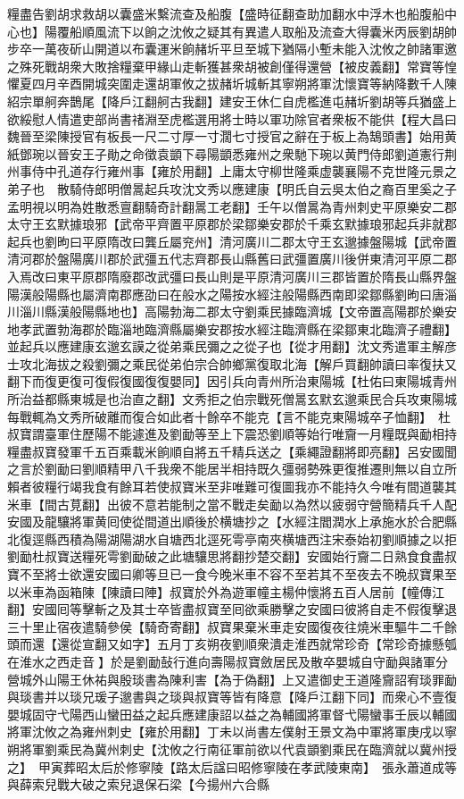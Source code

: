 糧盡告劉胡求救胡以囊盛米繫流查及船腹【盛時征翻查助加翻水中浮木也船腹船中心也】陽覆船順風流下以餉之沈攸之疑其有異遣人取船及流查大得囊米丙辰劉胡帥步卒一萬夜斫山開道以布囊運米餉赭圻平旦至城下猶隔小塹未能入沈攸之帥諸軍邀之殊死戰胡衆大敗捨糧棄甲緣山走斬獲甚衆胡被創僅得還營【被皮義翻】常寶等惶懼夏四月辛酉開城突圍走還胡軍攸之拔赭圻城斬其寧朔將軍沈懷寶等納降數千人陳紹宗單舸奔鵲尾【降戶江翻舸古我翻】建安王休仁自虎檻進屯赭圻劉胡等兵猶盛上欲綏慰人情遣吏部尚書禇淵至虎檻選用將士時以軍功除官者衆板不能供【程大昌曰魏晉至梁陳授官有板長一尺二寸厚一寸濶七寸授官之辭在于板上為鵠頭書】始用黄紙鄧琬以晉安王子勛之命徵袁顗下尋陽顗悉雍州之衆馳下琬以黄門侍郎劉道憲行荆州事侍中孔道存行雍州事【雍於用翻】上庸太守柳世隆乘虚襲襄陽不克世隆元景之弟子也　散騎侍郎明僧暠起兵攻沈文秀以應建康【明氏自云吳太伯之裔百里奚之子孟明視以明為姓散悉亶翻騎奇計翻暠工老翻】壬午以僧暠為青州刺史平原樂安二郡太守王玄默據琅邪【武帝平齊置平原郡於梁鄒樂安郡於千乘玄默據琅邪起兵非就郡起兵也劉昫曰平原隋改曰龔丘屬兖州】清河廣川二郡太守王玄邈據盤陽城【武帝置清河郡於盤陽廣川郡於武彊五代志齊郡長山縣舊曰武彊置廣川後併東清河平原二郡入焉改曰東平原郡隋廢郡改武彊曰長山則是平原清河廣川三郡皆置於隋長山縣界盤陽漢般陽縣也屬濟南郡應劭曰在般水之陽按水經注般陽縣西南即梁鄒縣劉昫曰唐淄川淄川縣漢般陽縣地也】高陽勃海二郡太守劉乘民據臨濟城【文帝置高陽郡於樂安地孝武置勃海郡於臨淄地臨濟縣屬樂安郡按水經注臨濟縣在梁鄒東北臨濟子禮翻】並起兵以應建康玄邈玄謨之從弟乘民彌之之從子也【從才用翻】沈文秀遣軍主解彦士攻北海拔之殺劉彌之乘民從弟伯宗合帥鄉黨復取北海【解戶買翻帥讀曰率復扶又翻下而復更復可復假復國復復嬰同】因引兵向青州所治東陽城【杜佑曰東陽城青州所治益都縣東城是也治直之翻】文秀拒之伯宗戰死僧暠玄默玄邈乘民合兵攻東陽城每戰輒為文秀所破離而復合如此者十餘卒不能克【言不能克東陽城卒子恤翻】　杜叔寶謂臺軍住歷陽不能遽進及劉勔等至上下震恐劉順等始行唯齎一月糧既與勔相持糧盡叔寶發軍千五百乘載米餉順自將五千精兵送之【乘繩證翻將即亮翻】呂安國聞之言於劉勔曰劉順精甲八千我衆不能居半相持既久彊弱勢殊更復推遷則無以自立所賴者彼糧行竭我食有餘耳若使叔寶米至非唯難可復圖我亦不能持久今唯有間道襲其米車【間古莧翻】出彼不意若能制之當不戰走矣勔以為然以疲弱守營簡精兵千人配安國及龍驤將軍黄囘使從間道出順後於横塘抄之【水經注閻潤水上承施水於合肥縣北復逕縣西積為陽湖陽湖水自塘西北逕死雩亭南夾横塘西注宋泰始初劉順據之以拒劉勔杜叔寶送糧死雩劉勔破之此塘驤思將翻抄楚交翻】安國始行齎二日熟食食盡叔寶不至將士欲還安國曰卿等旦已一食今晚米車不容不至若其不至夜去不晩叔寶果至以米車為函箱陳【陳讀曰陣】叔寶於外為遊軍幢主楊仲懷將五百人居前【幢傳江翻】安國囘等擊斬之及其士卒皆盡叔寶至囘欲乘勝擊之安國曰彼將自走不假復擊退三十里止宿夜遣騎參侯【騎奇寄翻】叔寶果棄米車走安國復夜往燒米車驅牛二千餘頭而還【還從宣翻又如字】五月丁亥朔夜劉順衆潰走淮西就常珍奇【常珍奇據懸瓠在淮水之西走音】於是劉勔鼔行進向壽陽叔寶斂居民及散卒嬰城自守勔與諸軍分營城外山陽王休祐與殷琰書為陳利害【為于偽翻】上又遣御史王道隆齎詔宥琰罪勔與琰書并以琰兄瑗子邈書與之琰與叔寶等皆有降意【降戶江翻下同】而衆心不壹復嬰城固守弋陽西山蠻田益之起兵應建康詔以益之為輔國將軍督弋陽蠻事壬辰以輔國將軍沈攸之為雍州刺史【雍於用翻】丁未以尚書左僕射王景文為中軍將軍庚戌以寧朔將軍劉乘民為冀州刺史【沈攸之行南征軍前欲以代袁顗劉乘民在臨濟就以冀州授之】　甲寅葬昭太后於修寧陵【路太后諡曰昭修寧陵在孝武陵東南】　張永蕭道成等與薛索兒戰大破之索兒退保石梁【今揚州六合縣